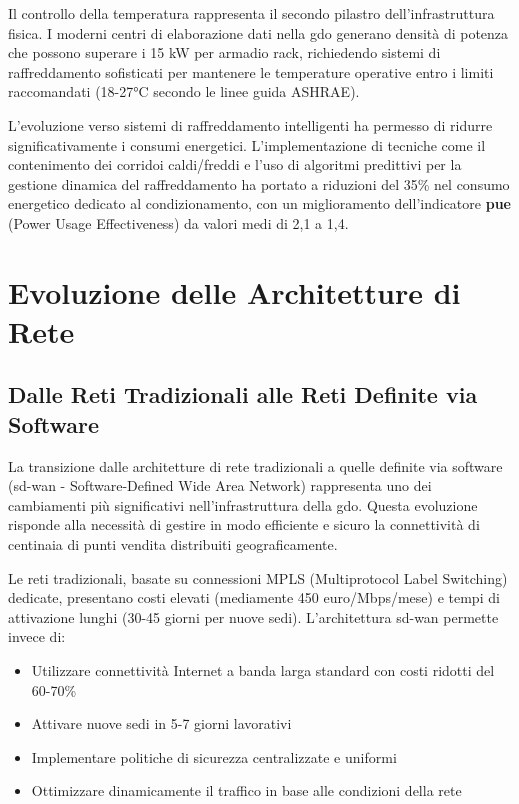 Il controllo della temperatura rappresenta il secondo pilastro dell'infrastruttura fisica. I moderni centri di elaborazione dati nella \gls{gdo} generano densità di potenza che possono superare i 15 kW per armadio rack, richiedendo sistemi di raffreddamento sofisticati per mantenere le temperature operative entro i limiti raccomandati (18-27°C secondo le linee guida ASHRAE\autocite{ASHRAE2023}).

L'evoluzione verso sistemi di raffreddamento intelligenti ha permesso di ridurre significativamente i consumi energetici. L'implementazione di tecniche come il contenimento dei corridoi caldi/freddi e l'uso di algoritmi predittivi per la gestione dinamica del raffreddamento ha portato a riduzioni del 35\% nel consumo energetico dedicato al condizionamento, con un miglioramento dell'indicatore \textbf{\gls{pue}} (Power Usage Effectiveness) da valori medi di 2,1 a 1,4.

\section{Evoluzione delle Architetture di Rete}
\label{sec:architetture_rete}

\subsection{Dalle Reti Tradizionali alle Reti Definite via Software}
\label{subsec:sdn}

La transizione dalle architetture di rete tradizionali a quelle definite via software (\gls{sd-wan} - Software-Defined Wide Area Network) rappresenta uno dei cambiamenti più significativi nell'infrastruttura della \gls{gdo}. Questa evoluzione risponde alla necessità di gestire in modo efficiente e sicuro la connettività di centinaia di punti vendita distribuiti geograficamente\autocite{Cisco2024}.

Le reti tradizionali, basate su connessioni MPLS (Multiprotocol Label Switching) dedicate, presentano costi elevati (mediamente 450 euro/Mbps/mese) e tempi di attivazione lunghi (30-45 giorni per nuove sedi). L'architettura \gls{sd-wan} permette invece di:

\begin{itemize}
    \item Utilizzare connettività Internet a banda larga standard con costi ridotti del 60-70\%
    \item Attivare nuove sedi in 5-7 giorni lavorativi
    \item Implementare politiche di sicurezza centralizzate e uniformi
    \item Ottimizzare dinamicamente il traffico in base alle condizioni della rete
\end{itemize}

